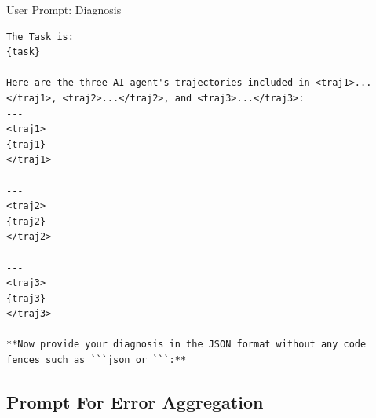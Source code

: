 \begin{UserPromptBox}{User Prompt: Diagnosis}
\begin{lstlisting}
The Task is:
{task}

Here are the three AI agent's trajectories included in <traj1>...</traj1>, <traj2>...</traj2>, and <traj3>...</traj3>:
---
<traj1>
{traj1}
</traj1>

---
<traj2>
{traj2}
</traj2>

---
<traj3>
{traj3}
</traj3>

**Now provide your diagnosis in the JSON format without any code fences such as ```json or ```:**
\end{lstlisting}
\end{UserPromptBox}




\subsection{Prompt For Error Aggregation}

